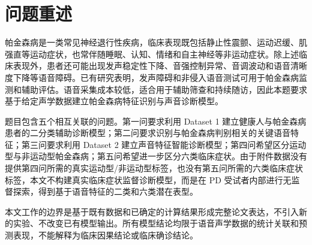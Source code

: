 \section{问题重述}

帕金森病是一类常见神经退行性疾病，临床表现既包括静止性震颤、运动迟缓、肌强直等运动症状，也常伴随睡眠、认知、情绪和自主神经等非运动症状。除上述临床表现外，患者还可能出现发声稳定性下降、音强控制异常、音调波动和语音清晰度下降等语音障碍。已有研究表明，发声障碍和非侵入语音测试可用于帕金森病监测和辅助评估。语音采集成本较低，适合用于辅助筛查和持续随访，因此本题要求基于给定声学数据建立帕金森病特征识别与声音诊断模型。

题目包含五个相互关联的问题。第一问要求利用 Dataset 1 建立健康人与帕金森病患者的二分类辅助诊断模型；第二问要求识别与帕金森病判别相关的关键语音特征；第三问要求利用 Dataset 2 建立声音特征智能诊断模型；第四问希望区分运动型与非运动型帕金森病；第五问希望进一步区分六类临床症状。由于附件数据没有提供第四问所需的真实运动型/非运动型标签，也没有第五问所需的六类临床症状标签，本文不构建真实临床症状监督诊断模型，而是在 PD 受试者内部进行无监督探索，得到基于语音特征的二类和六类潜在表型。

本文工作的边界是基于既有数据和已确定的计算结果形成完整论文表达，不引入新的实验、不改变已有模型输出。所有模型结论均限于语音声学数据的统计关联和预测表现，不能解释为临床因果结论或临床确诊结论。
